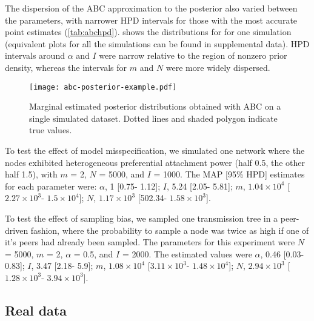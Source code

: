 \documentclass[12pt]{article}\usepackage[]{graphicx}\usepackage[]{color}
\begin{document}
The dispersion of the \gls{ABC} approximation to the posterior also varied
between the parameters, with narrower \gls{HPD} intervals for those with the
most accurate point estimates (\cref{tab:abchpd}).  shows the
distributions for for one simulation (equivalent plots for all the simulations
can be found in supplemental data). \Gls{HPD} intervals around $\alpha$ and $I$
were narrow relative to the region of nonzero prior density, whereas the
intervals for $m$ and $N$ were more widely dispersed.

\begin{figure}[ht]
  \centering
  \texttt{[image: abc-posterior-example.pdf]}
  \caption{Marginal estimated posterior distributions obtained with ABC on a
  single simulated dataset. Dotted lines and shaded polygon indicate true
  values.}
  \label{fig:abcex}
\end{figure}



To test the effect of model misspecification, we simulated one network where
the nodes exhibited heterogeneous preferential attachment power (half 0.5, the
other half 1.5), with $m$ = 2, $N$ = 5000, and $I$ = 1000. The \gls{MAP} [95\%
HPD] estimates for each parameter were: 
$\alpha$, 
  1 [0.75-
                           1.12];
$I$,
  5.24 [2.05-
                       5.81];
$m$,
  \ensuremath{1.04\times 10^{4}} [\ensuremath{2.27\times 10^{3}}-
                              \ensuremath{1.5\times 10^{4}}];
$N$,
  \ensuremath{1.17\times 10^{3}} [502.34-
                       \ensuremath{1.58\times 10^{3}}].



To test the effect of sampling bias, we sampled one transmission tree in a
peer-driven fashion, where the probability to sample a node was twice as high
if one of it's peers had already been sampled. The parameters for this
experiment were $N$ = 5000, $m$ = 2, $\alpha$ = 0.5, and $I$ = 2000. The
estimated values were
$\alpha$, 
  0.46 [0.03-
                           0.83];
$I$,
  3.47 [2.18-
                       5.9];
$m$,
  \ensuremath{1.08\times 10^{4}} [\ensuremath{3.11\times 10^{3}}-
                              \ensuremath{1.48\times 10^{4}}];
$N$,
  \ensuremath{2.94\times 10^{3}} [\ensuremath{1.28\times 10^{3}}-
                       \ensuremath{3.94\times 10^{3}}].

\subsection*{Real data}
\end{document}
